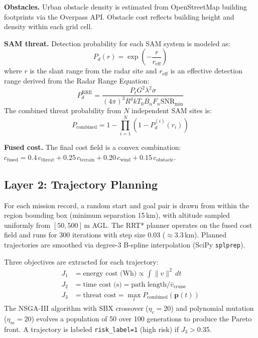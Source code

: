 ﻿\documentclass{article}
\begin{document}
\textbf{Obstacles.} Urban obstacle density is estimated from OpenStreetMap
building footprints \citep{openstreetmap} via the Overpass API. Obstacle
cost reflects building height and density within each grid cell.

\textbf{SAM threat.} Detection probability for each SAM system is modeled as:
\begin{equation}
  P_d(r) = \exp\!\left(-\frac{r}{r_\text{eff}}\right)
  \label{eq:sam_pd}
\end{equation}
where $r$ is the slant range from the radar site and $r_\text{eff}$ is an
effective detection range derived from the Radar Range Equation:
\begin{equation}
  P_d^{\text{RRE}} = \frac{P_t G^2 \lambda^2 \sigma}{(4\pi)^3 R^4 k T_0 B_n F_n \text{SNR}_\text{min}}
  \label{eq:rre}
\end{equation}
The combined threat probability from $N$ independent SAM sites is:
\begin{equation}
  P_\text{combined} = 1 - \prod_{i=1}^{N}\left(1 - P_d^{(i)}(r_i)\right)
  \label{eq:combined_threat}
\end{equation}

\textbf{Fused cost.} The final cost field is a convex combination:
$c_\text{fused} = 0.4\,c_\text{threat} + 0.25\,c_\text{terrain} + 0.20\,c_\text{wind} + 0.15\,c_\text{obstacle}$.

\subsection{Layer 2: Trajectory Planning}
\label{sec:planning}

For each mission record, a random start and goal pair is drawn from within
the region bounding box (minimum separation 15\,km), with altitude sampled
uniformly from $[50, 500]$\,m AGL. The RRT* planner \citep{karaman2011sampling}
operates on the fused cost field and runs for 300 iterations with step size
0.03\textdegree{} ($\approx$3.3\,km). Planned trajectories are smoothed via
degree-3 B-spline interpolation (SciPy \texttt{splprep}).

Three objectives are extracted for each trajectory:
\begin{align}
  J_1 &= \text{energy cost (Wh)} \propto \int \|v\|^2\,dt \\
  J_2 &= \text{time cost (s)} = \text{path length} / \bar{v}_\text{cruise} \\
  J_3 &= \text{threat cost} = \max_{t} P_\text{combined}(\mathbf{p}(t))
\end{align}
The NSGA-III algorithm \citep{deb2014evolutionary} with SBX crossover
($\eta_c = 20$) and polynomial mutation ($\eta_m = 20$) evolves a population
of 50 over 100 generations to produce the Pareto front. A trajectory is
labeled \texttt{risk\_label=1} (high risk) if $J_3 > 0.35$.
\end{document}
